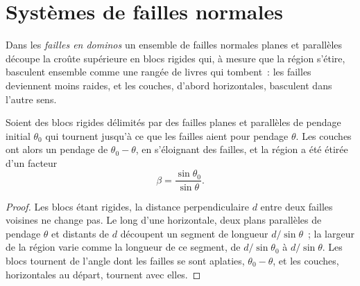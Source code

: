 \begin{omfigure}
\par{}\label{fig:b3:extension-strike-slip:models}
\end{omfigure}

\section{Systèmes de failles normales}\label{sec:b3:extension-strike-slip:faults}

\begin{definition}\label{def:b3:extension-strike-slip:domino}
Dans les \emph{failles en dominos} un ensemble de failles normales planes
et parallèles découpe la croûte supérieure en blocs rigides qui, à mesure que la région
s'étire, basculent ensemble comme une rangée de livres qui tombent~: les failles
deviennent moins raides, et les couches, d'abord horizontales, basculent dans l'autre sens.
\end{definition}

\begin{theorem}\label{thm:b3:extension-strike-slip:domino}
Soient des blocs rigides délimités par des failles planes et parallèles de pendage initial
$\theta_0$ qui tournent jusqu'à ce que les failles aient pour pendage $\theta$. Les couches ont alors un pendage de $\theta_0
- \theta$, en s'éloignant des failles, et la région a été étirée
d'un facteur
\[
  \beta = \frac{\sin\theta_0}{\sin\theta} .
\]
\end{theorem}

\begin{proof}
Les blocs étant rigides, la distance perpendiculaire $d$ entre deux
failles voisines ne change pas. Le long d'une horizontale, deux plans parallèles
de pendage $\theta$ et distants de $d$ découpent un segment de longueur $d/\sin
\theta$~; la largeur de la région varie comme la longueur de ce segment, de
$d/\sin\theta_0$ à $d/\sin\theta$. Les blocs tournent de l'angle dont
les failles se sont aplaties, $\theta_0 - \theta$, et les couches, horizontales
au départ, tournent avec elles.
\end{proof}

